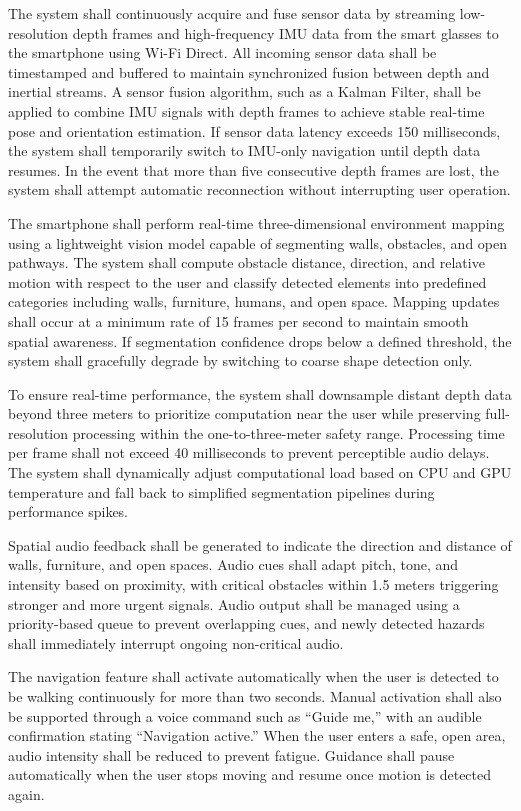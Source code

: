 The system shall continuously acquire and fuse sensor data by streaming low-resolution depth frames and high-frequency IMU data from the smart glasses to the smartphone using Wi-Fi Direct. All incoming sensor data shall be timestamped and buffered to maintain synchronized fusion between depth and inertial streams. A sensor fusion algorithm, such as a Kalman Filter, shall be applied to combine IMU signals with depth frames to achieve stable real-time pose and orientation estimation. If sensor data latency exceeds 150 milliseconds, the system shall temporarily switch to IMU-only navigation until depth data resumes. In the event that more than five consecutive depth frames are lost, the system shall attempt automatic reconnection without interrupting user operation.

The smartphone shall perform real-time three-dimensional environment mapping using a lightweight vision model capable of segmenting walls, obstacles, and open pathways. The system shall compute obstacle distance, direction, and relative motion with respect to the user and classify detected elements into predefined categories including walls, furniture, humans, and open space. Mapping updates shall occur at a minimum rate of 15 frames per second to maintain smooth spatial awareness. If segmentation confidence drops below a defined threshold, the system shall gracefully degrade by switching to coarse shape detection only.

To ensure real-time performance, the system shall downsample distant depth data beyond three meters to prioritize computation near the user while preserving full-resolution processing within the one-to-three-meter safety range. Processing time per frame shall not exceed 40 milliseconds to prevent perceptible audio delays. The system shall dynamically adjust computational load based on CPU and GPU temperature and fall back to simplified segmentation pipelines during performance spikes.

Spatial audio feedback shall be generated to indicate the direction and distance of walls, furniture, and open spaces. Audio cues shall adapt pitch, tone, and intensity based on proximity, with critical obstacles within 1.5 meters triggering stronger and more urgent signals. Audio output shall be managed using a priority-based queue to prevent overlapping cues, and newly detected hazards shall immediately interrupt ongoing non-critical audio.

The navigation feature shall activate automatically when the user is detected to be walking continuously for more than two seconds. Manual activation shall also be supported through a voice command such as “Guide me,” with an audible confirmation stating “Navigation active.” When the user enters a safe, open area, audio intensity shall be reduced to prevent fatigue. Guidance shall pause automatically when the user stops moving and resume once motion is detected again.

